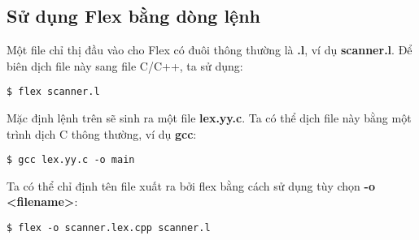 \documentclass[../report.tex]{subfiles}
\begin{document}
\subsection{Sử dụng Flex bằng dòng lệnh} 
Một file chỉ thị đầu vào cho Flex có đuôi thông thường là \textbf{.l}, ví dụ \textbf{scanner.l}. 
Để biên dịch file này sang file C/C++, ta sử dụng:
\begin{verbatim}
$ flex scanner.l
\end{verbatim}
Mặc định lệnh trên sẽ sinh ra một file \textbf{lex.yy.c}.
Ta có thể dịch file này bằng một trình dịch C thông thường, ví dụ \textbf{gcc}:
\begin{verbatim}
$ gcc lex.yy.c -o main
\end{verbatim}
Ta có thể chỉ định tên file xuất ra bởi flex bằng cách sử dụng tùy chọn \textbf{-o <filename>}:
\begin{verbatim}
$ flex -o scanner.lex.cpp scanner.l
\end{verbatim}
\end{document}
